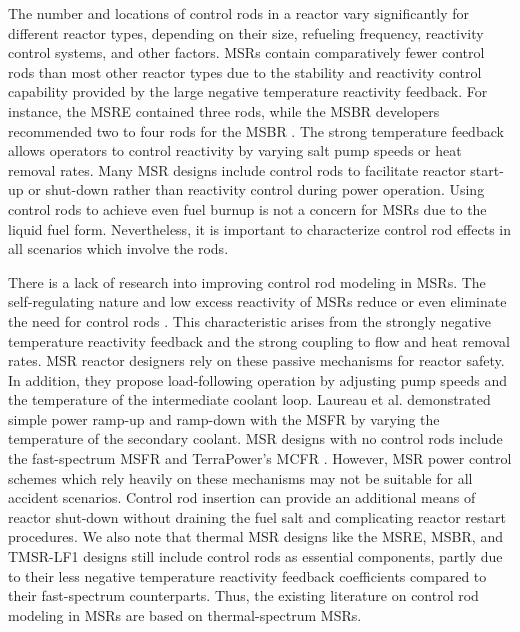The number and locations of control rods in a reactor vary significantly for different reactor
types, depending on their size, refueling frequency, reactivity control systems, and other factors.
\glspl{MSR} contain comparatively fewer control rods than most other reactor types due to the
stability and reactivity control capability provided by the large negative temperature
reactivity feedback. For instance, the \gls{MSRE} contained three rods, while the \gls{MSBR}
developers recommended two to four rods for the \gls{MSBR} \cite{robertson_msre_1965,
robertson_conceptual_1971}. The
strong temperature feedback allows operators to control reactivity by varying salt pump
speeds or heat removal rates. Many \gls{MSR} designs include control rods to facilitate reactor
start-up or shut-down rather than reactivity control during power operation. Using
control rods to achieve even fuel burnup is not a concern for \glspl{MSR} due to the liquid fuel
form. Nevertheless, it is important to characterize control rod effects in all scenarios which
involve the rods.

There is a lack of research into improving control rod modeling in \glspl{MSR}.
The self-regulating nature and low excess reactivity of \glspl{MSR} reduce or even eliminate the
need for control rods \cite{dolan_1_2017}. This characteristic arises from the strongly negative
temperature reactivity feedback and the strong coupling to flow and heat removal rates. \gls{MSR}
reactor designers rely on these passive mechanisms for reactor safety. In addition, they propose
load-following operation by adjusting pump speeds and the temperature of the intermediate coolant
loop. Laureau et al. \cite{laureau_transient_2017} demonstrated simple power ramp-up and ramp-down
with the \gls{MSFR} by varying the temperature of the secondary coolant. \gls{MSR}
designs with no control rods include the fast-spectrum \gls{MSFR} and TerraPower's \gls{MCFR}
\cite{terrapower_terrapower_2021}. However, \gls{MSR} power control schemes which rely heavily on
these mechanisms may not be suitable for all accident scenarios. Control rod insertion can provide
an additional means of reactor shut-down without draining the fuel salt and
complicating reactor restart procedures. We also note that thermal \gls{MSR} designs like the
\gls{MSRE}, \gls{MSBR}, and TMSR-LF1 designs still include control rods as essential components,
partly due to their less negative temperature reactivity feedback coefficients
compared to their fast-spectrum counterparts. Thus, the existing literature on control rod modeling
in \glspl{MSR} are based on thermal-spectrum \glspl{MSR}.

